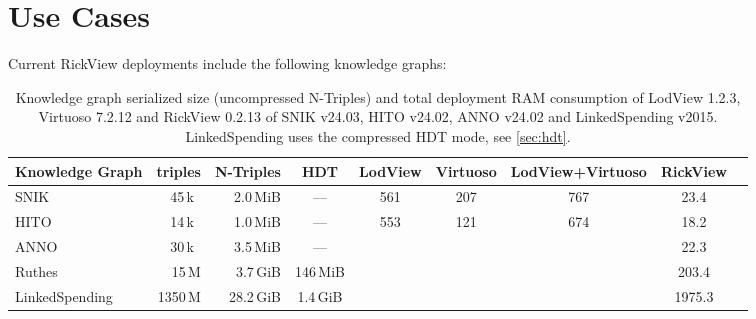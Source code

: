 \documentclass{ceurart}
\begin{document}
\section{Use Cases}
Current RickView deployments include the following knowledge graphs:

\begin{table}
\begin{tabular}{lrrcSSSSS}
\toprule
Knowledge Graph	&\textnormal{triples}		&\textnormal{N-Triples}	&\textnormal{HDT}	&\textnormal{LodView}	&\textnormal{Virtuoso}	&\textnormal{LodView+Virtuoso}	&\textnormal{RickView}\\
\midrule
SNIK	 		&45\,k~						&2.0\,MiB				& ---				&561					&207					&767							&23.4\\
HITO 			&14\,k~						&1.0\,MiB				& ---				&553					&121					&674								&18.2\\
ANNO			&30\,k~						&3.5\,MiB				& ---				&						&						&								&22.3\\
Ruthes			&15\,M						&3.7\,GiB				&146\,MiB			&						&						&								&203.4\\
LinkedSpending	&1350\,M					&28.2\,GiB				&1.4\,GiB			&						&						&								&1975.3\\
\bottomrule
\end{tabular}
\label{tab:stats}
\caption{Knowledge graph serialized size (uncompressed N-Triples) and total deployment RAM consumption of LodView 1.2.3, Virtuoso 7.2.12 and RickView 0.2.13 of SNIK v24.03, HITO v24.02, ANNO v24.02 and LinkedSpending v2015.
LinkedSpending uses the compressed HDT mode, see \cref{sec:hdt}.
}
\end{table}
\end{document}
